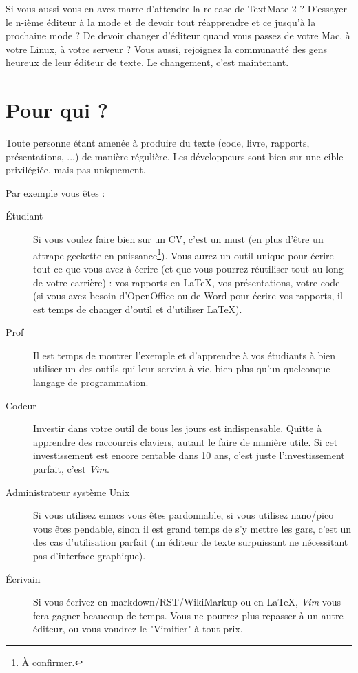 Si vous aussi vous en avez marre d'attendre la release de TextMate 2 ? D'essayer le n-ième éditeur à la mode et de devoir tout réapprendre et ce jusqu'à la prochaine mode ? De devoir changer d'éditeur quand vous passez de votre Mac, à votre Linux, à votre serveur ? Vous aussi, rejoignez la communauté des gens heureux de leur éditeur de texte. Le changement, c'est maintenant.

\section{Pour qui ?}

Toute personne étant amenée à produire du texte (code, livre, rapports, présentations, ...) de manière régulière. Les développeurs sont bien sur une cible privilégiée, mais pas uniquement.

Par exemple vous êtes :
\begin{description}
    \item[Étudiant] Si vous voulez faire bien sur un CV, c'est un must (en plus d'être un attrape geekette en puissance\footnote{À confirmer.}). Vous aurez un outil unique pour écrire tout ce que vous avez à écrire (et que vous pourrez réutiliser tout au long de votre carrière) : vos rapports en \LaTeX, vos présentations, votre code (si vous avez besoin d'OpenOffice ou de Word pour écrire vos rapports, il est temps de changer d'outil et d'utiliser \LaTeX).
    \item[Prof] Il est temps de montrer l'exemple et d'apprendre à vos étudiants à bien utiliser un des outils qui leur servira à vie, bien plus qu'un quelconque langage de programmation.
    \item[Codeur] Investir dans votre outil de tous les jours est indispensable. Quitte à apprendre des raccourcis claviers, autant le faire de manière utile. Si cet investissement est encore rentable dans 10 ans, c'est juste l'investissement parfait, c'est \emph{Vim}.
    \item[Administrateur système Unix] Si vous utilisez emacs vous êtes pardonnable, si vous utilisez nano/pico vous êtes pendable, sinon il est grand temps de s'y mettre les gars, c'est un des cas d'utilisation parfait (un éditeur de texte surpuissant ne nécessitant pas d'interface graphique).
    \item[Écrivain] Si vous écrivez en markdown/RST/WikiMarkup ou en \LaTeX, \emph{Vim} vous fera gagner beaucoup de temps. Vous ne pourrez plus repasser à un autre éditeur, ou vous voudrez le "Vimifier" à tout prix.
\end{description}

